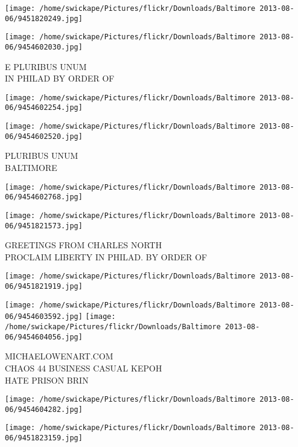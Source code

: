 \documentclass[10pt,letterpaper]{article}
\begin{document}
\texttt{[image: /home/swickape/Pictures/flickr/Downloads/Baltimore 2013-08-06/9451820249.jpg]}

\vspace{0.25in}
\texttt{[image: /home/swickape/Pictures/flickr/Downloads/Baltimore 2013-08-06/9454602030.jpg]}

E PLURIBUS UNUM\\
IN PHILAD BY ORDER OF\\
\pagebreak

\texttt{[image: /home/swickape/Pictures/flickr/Downloads/Baltimore 2013-08-06/9454602254.jpg]}

\vspace{0.25in}
\texttt{[image: /home/swickape/Pictures/flickr/Downloads/Baltimore 2013-08-06/9454602520.jpg]}

PLURIBUS UNUM\\
BALTIMORE\\
\pagebreak

\texttt{[image: /home/swickape/Pictures/flickr/Downloads/Baltimore 2013-08-06/9454602768.jpg]}

\vspace{0.25in}
\texttt{[image: /home/swickape/Pictures/flickr/Downloads/Baltimore 2013-08-06/9451821573.jpg]}

GREETINGS FROM CHARLES NORTH\\
PROCLAIM LIBERTY IN PHILAD. BY ORDER OF\\
\pagebreak

\texttt{[image: /home/swickape/Pictures/flickr/Downloads/Baltimore 2013-08-06/9451821919.jpg]}

\vspace{0.25in}
\texttt{[image: /home/swickape/Pictures/flickr/Downloads/Baltimore 2013-08-06/9454603592.jpg]}
\texttt{[image: /home/swickape/Pictures/flickr/Downloads/Baltimore 2013-08-06/9454604056.jpg]}

MICHAELOWENART.COM\\
CHAOS 44 BUSINESS CASUAL KEPOH\\
HATE PRISON BRIN\\
\pagebreak

\texttt{[image: /home/swickape/Pictures/flickr/Downloads/Baltimore 2013-08-06/9454604282.jpg]}

\vspace{0.25in}
\texttt{[image: /home/swickape/Pictures/flickr/Downloads/Baltimore 2013-08-06/9451823159.jpg]}
\end{document}

